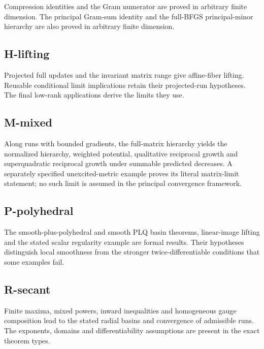 Compression identities and the Gram numerator are proved in arbitrary finite dimension. The principal Gram-sum identity and the full-BFGS principal-minor hierarchy are also proved in arbitrary finite dimension.



\subsection{H-lifting}\label{h-lifting}

Projected full updates and the invariant matrix range give affine-fiber lifting. Reusable conditional limit implications retain their projected-run hypotheses. The final low-rank applications derive the limits they use.



\subsection{M-mixed}\label{m-mixed}

Along runs with bounded gradients, the full-matrix hierarchy yields the normalized hierarchy, weighted potential, qualitative reciprocal growth and superquadratic reciprocal growth under summable predicted decreases. A separately specified unexcited-metric example proves its literal matrix-limit statement; no such limit is assumed in the principal convergence framework.



\subsection{P-polyhedral}\label{p-polyhedral}

The smooth-plus-polyhedral and smooth PLQ basin theorems, linear-image lifting and the stated scalar regularity example are formal results. Their hypotheses distinguish local smoothness from the stronger twice-differentiable conditions that some examples fail.



\subsection{R-secant}\label{r-secant}

Finite maxima, mixed powers, inward inequalities and homogeneous gauge composition lead to the stated radial basins and convergence of admissible runs. The exponents, domains and differentiability assumptions are present in the exact theorem types.

